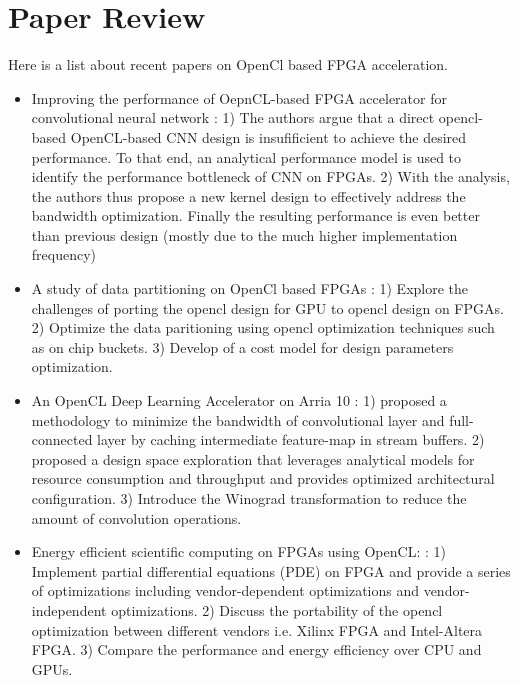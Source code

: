 \documentclass[12pt]{article} %
\begin{document}
\section{Paper Review} %
Here is a list about recent papers on OpenCl based FPGA acceleration.
\begin{itemize}
    \item Improving the performance of OepnCL-based FPGA accelerator for convolutional neural network \cite{zhang2017improving}:
        1) The authors argue that a direct opencl-based OpenCL-based CNN design is insufificient to achieve 
        the desired performance. To that end, an analytical performance model is used to identify the 
        performance bottleneck of CNN on FPGAs.
        2) With the analysis, the authors thus propose a new kernel design to effectively 
        address the bandwidth optimization. Finally the resulting performance is even better 
        than previous design (mostly due to the much higher implementation frequency)
    \item A study of data partitioning on OpenCl based FPGAs \cite{wang2015study}:
        1) Explore the challenges of porting the opencl design for GPU to opencl design on FPGAs.
        2) Optimize the data paritioning using opencl optimization techniques such as on chip buckets.
        3) Develop of a cost model for design parameters optimization.

    \item An OpenCL Deep Learning Accelerator on Arria 10 \cite{aydonat2017opencl}: 
        1) proposed a methodology to minimize the bandwidth of convolutional layer and 
        full-connected layer by caching intermediate feature-map in stream buffers.
        2) proposed a design space exploration that leverages analytical models for 
        resource consumption and throughput and provides optimized architectural configuration.
        3) Introduce the Winograd transformation to reduce the amount of convolution operations.

    \item Energy efficient scientific computing on FPGAs using OpenCL: \cite{weller2017energy}:
        1) Implement partial differential equations (PDE) on FPGA and provide a series of 
        optimizations including vendor-dependent optimizations and vendor-independent optimizations.
        2) Discuss the portability of the opencl optimization between different vendors i.e. Xilinx 
        FPGA and Intel-Altera FPGA.
        3) Compare the performance and energy efficiency over CPU and GPUs.


\end{itemize}
\end{document}
